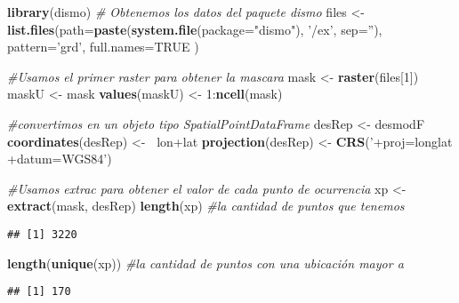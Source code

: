 \documentclass[]{article}
\newenvironment{Shaded}{\begin{snugshade}}{\end{snugshade}}
\newcommand{\KeywordTok}[1]{\textcolor[rgb]{0.13,0.29,0.53}{\textbf{{#1}}}}
\newcommand{\DataTypeTok}[1]{\textcolor[rgb]{0.13,0.29,0.53}{{#1}}}
\newcommand{\DecValTok}[1]{\textcolor[rgb]{0.00,0.00,0.81}{{#1}}}
\newcommand{\StringTok}[1]{\textcolor[rgb]{0.31,0.60,0.02}{{#1}}}
\newcommand{\CommentTok}[1]{\textcolor[rgb]{0.56,0.35,0.01}{\textit{{#1}}}}
\newcommand{\OtherTok}[1]{\textcolor[rgb]{0.56,0.35,0.01}{{#1}}}
\newcommand{\ErrorTok}[1]{\textcolor[rgb]{0.64,0.00,0.00}{\textbf{{#1}}}}
\newcommand{\NormalTok}[1]{{#1}}
\begin{document}
\begin{Shaded}
\begin{Highlighting}[]
\KeywordTok{library}\NormalTok{(dismo)}
\CommentTok{# Obtenemos los datos del paquete dismo}
\NormalTok{files <-}\StringTok{ }\KeywordTok{list.files}\NormalTok{(}\DataTypeTok{path=}\KeywordTok{paste}\NormalTok{(}\KeywordTok{system.file}\NormalTok{(}\DataTypeTok{package=}\StringTok{"dismo"}\NormalTok{), }\StringTok{'/ex'}\NormalTok{,}
                       \DataTypeTok{sep=}\StringTok{''}\NormalTok{),  }\DataTypeTok{pattern=}\StringTok{'grd'}\NormalTok{,  }\DataTypeTok{full.names=}\OtherTok{TRUE} \NormalTok{)}

\CommentTok{#Usamos el primer raster para obtener la mascara }
\NormalTok{mask <-}\StringTok{ }\KeywordTok{raster}\NormalTok{(files[}\DecValTok{1}\NormalTok{])}
\NormalTok{maskU <-}\StringTok{ }\NormalTok{mask}
\KeywordTok{values}\NormalTok{(maskU) <-}\StringTok{ }\DecValTok{1}\NormalTok{:}\KeywordTok{ncell}\NormalTok{(mask)}

\CommentTok{#convertimos en un objeto tipo SpatialPointDataFrame}
\NormalTok{desRep <-}\StringTok{ }\NormalTok{desmodF}
\KeywordTok{coordinates}\NormalTok{(desRep) <-}\StringTok{ }\ErrorTok{~}\NormalTok{lon+lat}
\KeywordTok{projection}\NormalTok{(desRep) <-}\StringTok{ }\KeywordTok{CRS}\NormalTok{(}\StringTok{'+proj=longlat +datum=WGS84'}\NormalTok{)}

\CommentTok{#Usamos extrac para obtener el valor de cada punto de ocurrencia}
\NormalTok{xp <-}\StringTok{ }\KeywordTok{extract}\NormalTok{(mask, desRep)}
\KeywordTok{length}\NormalTok{(xp) }\CommentTok{#la cantidad de puntos que tenemos }
\end{Highlighting}
\end{Shaded}

\begin{verbatim}
## [1] 3220
\end{verbatim}

\begin{Shaded}
\begin{Highlighting}[]
\KeywordTok{length}\NormalTok{(}\KeywordTok{unique}\NormalTok{(xp)) }\CommentTok{#la cantidad de puntos con una ubicación mayor a }
\end{Highlighting}
\end{Shaded}

\begin{verbatim}
## [1] 170
\end{verbatim}
\end{document}
